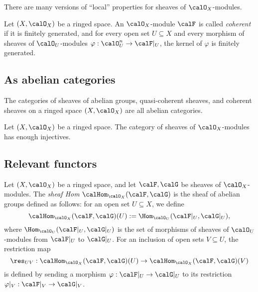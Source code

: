     \begin{remark}\label{rmk:local_properties_of_sheaves}
        There are many versions of ``local'' properties for sheaves of \(\calO_X\)-modules.
    \end{remark}

    \begin{definition}\label{def:coherent_sheaf}
        Let \((X,\calO_X)\) be a ringed space.
        An \(\calO_X\)-module \(\calF\) is called \emph{coherent} if it is finitely generated, and for every open set \(U\subseteq X\) and every morphism of sheaves of \(\calO_U\)-modules \(\varphi:\calO_U^n \to \calF|_U\), the kernel of \(\varphi\) is finitely generated.
    \end{definition}

\subsection{As abelian categories}

    \begin{theorem}\label{thm:sheaves_of_ab_mod_qcoh_coh_are_abelian_categories}
        The categories of sheaves of abelian groups, quasi-coherent sheaves, and coherent sheaves on a ringed space \((X,\calO_X)\) are all abelian categories.
    \end{theorem}

    \begin{theorem}\label{thm:O_X_mod_has_enough_injectives}
        Let \((X,\calO_X)\) be a ringed space.
        The category of sheaves of \(\calO_X\)-modules has enough injectives.
    \end{theorem}

    

\subsection{Relevant functors}

    \begin{definition}\label{def:hom_sheaves}
        Let \((X,\calO_X)\) be a ringed space, and let \(\calF,\calG\) be sheaves of \(\calO_X\)-modules.
        The \emph{sheaf Hom} \(\calHom_{\calO_X}(\calF,\calG)\) is the sheaf of abelian groups defined as follows:
        for an open set \(U\subseteq X\), we define
        \[
            \calHom_{\calO_X}(\calF,\calG)(U) := \Hom_{\calO_U}(\calF|_U,\calG|_U),
        \]
        where \(\Hom_{\calO_U}(\calF|_U,\calG|_U)\) is the set of morphisms of sheaves of \(\calO_U\)-modules from \(\calF|_U\) to \(\calG|_U\).
        For an inclusion of open sets \(V\subseteq U\), the restriction map
        \[
            \res_{UV}:\calHom_{\calO_X}(\calF,\calG)(U) \to \calHom_{\calO_X}(\calF,\calG)(V)
        \]
        is defined by sending a morphism \(\varphi:\calF|_U \to \calG|_U\) to its restriction \(\varphi|_V:\calF|_V \to \calG|_V\).
    \end{definition}

